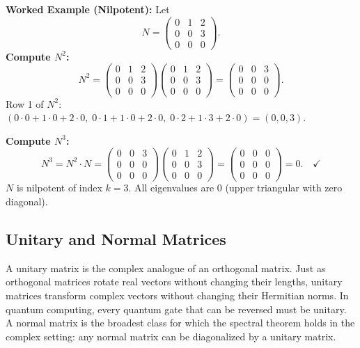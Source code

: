 \documentclass[12pt,a4paper]{article}
\begin{document}
\textbf{Worked Example (Nilpotent):} Let
\[
  N = \begin{pmatrix} 0 & 1 & 2 \\ 0 & 0 & 3 \\ 0 & 0 & 0 \end{pmatrix}.
\]
\textbf{Compute $N^2$:}
\[
  N^2 = \begin{pmatrix} 0 & 1 & 2 \\ 0 & 0 & 3 \\ 0 & 0 & 0 \end{pmatrix}
        \begin{pmatrix} 0 & 1 & 2 \\ 0 & 0 & 3 \\ 0 & 0 & 0 \end{pmatrix}
      = \begin{pmatrix} 0 & 0 & 3 \\ 0 & 0 & 0 \\ 0 & 0 & 0 \end{pmatrix}.
\]
Row 1 of $N^2$: $(0\cdot0+1\cdot0+2\cdot0,\; 0\cdot1+1\cdot0+2\cdot0,\; 0\cdot2+1\cdot3+2\cdot0) = (0,0,3)$. \quad \checkmark

\textbf{Compute $N^3$:}
\[
  N^3 = N^2 \cdot N = \begin{pmatrix} 0 & 0 & 3 \\ 0 & 0 & 0 \\ 0 & 0 & 0 \end{pmatrix}
                      \begin{pmatrix} 0 & 1 & 2 \\ 0 & 0 & 3 \\ 0 & 0 & 0 \end{pmatrix}
      = \begin{pmatrix} 0 & 0 & 0 \\ 0 & 0 & 0 \\ 0 & 0 & 0 \end{pmatrix} = 0. \quad \checkmark
\]
$N$ is nilpotent of index $k = 3$. All eigenvalues are $0$ (upper triangular with zero diagonal). \quad \checkmark

\subsection{Unitary and Normal Matrices}

A unitary matrix is the complex analogue of an orthogonal matrix.
Just as orthogonal matrices rotate real vectors without changing their lengths,
unitary matrices transform complex vectors without changing their Hermitian norms.
In quantum computing, every quantum gate that can be reversed must be unitary.
A normal matrix is the broadest class for which the spectral theorem holds in the complex setting:
any normal matrix can be diagonalized by a unitary matrix.
\end{document}
